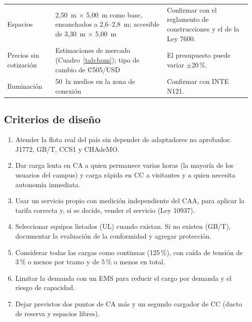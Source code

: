 {\begin{longtable}{L{3.3cm}L{5.4cm}L{6.3cm}}
Espacios & 2,50~m $\times$ 5,00~m como base, ensanchados a 2,6--2,8~m; accesible de 3,30~m $\times$ 5,00~m & Confirmar con el reglamento de construcciones y el de la Ley 7600.\\
Precios sin cotización & Estimaciones de mercado (Cuadro~\ref{tab:bom}); tipo de cambio de ₡505/USD & El presupuesto puede variar $\pm$20\,\%.\\
Iluminación & 50~lx medios en la zona de conexión & Confirmar con INTE N121.\\
\bottomrule
\end{longtable}}

\subsection{Criterios de diseño}
\begin{enumerate}[leftmargin=1.2cm]
\item Atender la flota real del país sin depender de adaptadores no aprobados: J1772, GB/T, CCS1 y CHAdeMO.
\item Dar carga lenta en CA a quien permanece varias horas (la mayoría de los usuarios del campus) y carga rápida en CC a visitantes y a quien necesita autonomía inmediata.
\item Usar un servicio propio con medición independiente del CAA, para aplicar la tarifa correcta y, si se decide, vender el servicio (Ley 10937).
\item Seleccionar equipos listados (UL) cuando existan. Si no existen (GB/T), documentar la evaluación de la conformidad y agregar protección.
\item Considerar todas las cargas como continuas (125\,\%), con caída de tensión de 3\,\% o menos por tramo y de 5\,\% o menos en total.
\item Limitar la demanda con un EMS para reducir el cargo por demanda y el riesgo de capacidad.
\item Dejar previstos dos puntos de CA más y un segundo cargador de CC (ducto de reserva y espacios libres).
\end{enumerate}

